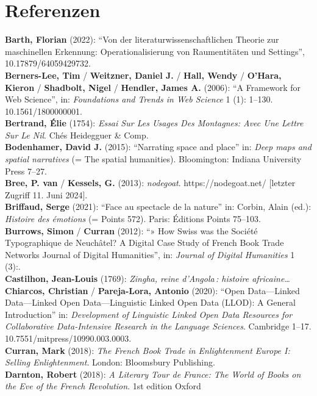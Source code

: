 \documentclass[
  12pt,
  letterpaper,
  DIV=11,
  numbers=noendperiod]{scrreprt}
\begin{document}
\section{Referenzen}\label{referenzen-1}

\textbf{Barth, Florian} (2022): ``Von der literaturwissenschaftlichen
Theorie zur maschinellen Erkennung: Operationalisierung von
Raumentitäten und Settings'', 10.17879/64059429732.\\
\textbf{Berners-Lee, Tim} / \textbf{Weitzner, Daniel J.} / \textbf{Hall,
Wendy} / \textbf{O'Hara, Kieron} / \textbf{Shadbolt, Nigel} /
\textbf{Hendler, James A.} (2006): ``A Framework for Web Science'', in:
\emph{Foundations and Trends in Web Science} 1 (1): 1--130.
10.1561/1800000001.\\
\textbf{Bertrand, Élie} (1754): \emph{Essai Sur Les Usages Des
Montagnes: Avec Une Lettre Sur Le Nil}. Chés Heidegguer \& Comp.\\
\textbf{Bodenhamer, David J.} (2015): ``Narrating space and place'' in:
\emph{Deep maps and spatial narratives} (= The spatial humanities).
Bloomington: Indiana University Press 7--27.\\
\textbf{Bree, P. van} / \textbf{Kessels, G.} (2013): \emph{nodegoat}.
https://nodegoat.net/ {[}letzter Zugriff 11. Juni 2024{]}.\\
\textbf{Briffaud, Serge} (2021): ``Face au spectacle de la nature'' in:
Corbin, Alain (ed.): \emph{Histoire des émotions} (= Points 572). Paris:
Éditions Points 75--103.\\
\textbf{Burrows, Simon} / \textbf{Curran} (2012): ``» How Swiss was the
Société Typographique de Neuchâtel? A Digital Case Study of French Book
Trade Networks Journal of Digital Humanities'', in: \emph{Journal of
Digital Humanities} 1 (3):.\\
\textbf{Castilhon, Jean-Louis} (1769): \emph{Zingha, reine d'Angola\,:
histoire africaine\ldots{}}\\
\textbf{Chiarcos, Christian} / \textbf{Pareja-Lora, Antonio} (2020):
``Open Data---Linked Data---Linked Open Data---Linguistic Linked Open
Data (LLOD): A General Introduction'' in: \emph{Development of
Linguistic Linked Open Data Resources for Collaborative Data-Intensive
Research in the Language Sciences}. Cambridge 1--17.
10.7551/mitpress/10990.003.0003.\\
\textbf{Curran, Mark} (2018): \emph{The French Book Trade in
Enlightenment Europe I: Selling Enlightenment}. London: Bloomsbury
Publishing.\\
\textbf{Darnton, Robert} (2018): \emph{A Literary Tour de France: The
World of Books on the Eve of the French Revolution}. 1st edition Oxford
\end{document}
